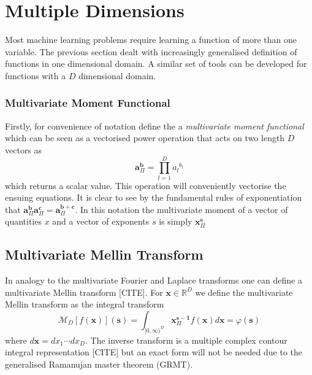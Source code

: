 \documentclass{article}
\begin{document}
\section{Multiple Dimensions}
Most machine learning problems require learning a function of more than one variable. The previous section dealt with increasingly generalised definition of functions in one dimensional domain. A similar set of tools can be developed for functions with a $D$ dimensional domain.

\subsubsection{Multivariate Moment Functional}
Firstly, for convenience of notation define the a \emph{multivariate moment functional} which can be seen as a vectorised power operation that acts on two length $D$ vectors as
\begin{equation}
\mathbf{a}^\mathbf{b}_\Pi = \prod_{l=1}^D {a_l}^{b_l}
\end{equation}
which returns a scalar value. This operation will conveniently vectorise the ensuing equations. It is clear to see by the fundamental rules of exponentiation that $\mathbf{a}^\mathbf{b}_\Pi\mathbf{a}^\mathbf{c}_\Pi = \mathbf{a}^{\mathbf{b+c}}_\Pi$.  In this notation the multivariate moment of a vector of quantities $x$ and a vector of exponents $s$ is simply $\mathbf{x}^\mathbf{s}_\Pi$

\subsection{Multivariate Mellin Transform}
In analogy to the multivariate Fourier and Laplace transforms one can define a multivariate Mellin transform [CITE]. For $\mathbf{x} \in \mathbb{R}^D$ we define the multivariate Mellin transform as the integral transform
\begin{equation}
\mathcal{M}_D[f(\mathbf{x})](\mathbf{s}) = \int_{[0,\infty)^D} \mathbf{x}^\mathbf{s-1}_\Pi f(\mathbf{x}) d \mathbf{x} = \varphi(\mathbf{s})
\end{equation}
where $d\mathbf{x} = dx_1 \cdots dx_D$. The inverse transform is a multiple complex contour integral representation [CITE] but an exact form will not be needed due to the generalised Ramanujan master theorem (GRMT).
\end{document}
